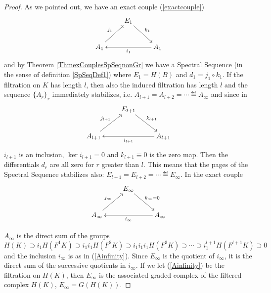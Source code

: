 \documentclass[../main.tex]{subfiles}
\begin{document}
\begin{proof}
    As we pointed out, we have an exact couple (\ref{exactcouple})
    \begin{align*}
     \xymatrix{
&E_1 \ar[rd]^{k_1}& \\
A_1\ar[ur]^{j_1}&& A_1\ar[ll]^{i_1} }
    \end{align*}
    and by Theorem \ref{ThmexCouplesSpSeqnonGr} we have a Spectral Sequence (in the sense of definition \ref{SpSeqDef1}) where $E_1=H(B)$ and $d_1=j_1 \circ k_1$. If the filtration on $K$ has length $l$, then also the induced filtration has length $l$ and the sequence $\{A_r\}_r$ immediately stabilizes, i.e. $A_{l+1}=A_{l+2}= \cdots \eqdef A_\infty$ and since in 
     \begin{align*}
     \xymatrix{
&E_{l+1} \ar[rd]^{k_{l+1}}& \\
A_{l+1}\ar[ur]^{j_{l+1}}&& A_{l+1}\ar[ll]^{i_{l+1}} }
    \end{align*}
    $i_{l+1}$ is an inclusion, $\ker i_{l+1} =0$ and $k_{l+1} \equiv 0$ is the zero map. Then the differentials $d_r$ are all zero for $r$ greater than $l$. This means that the pages of the Spectral Sequence stabilizes also:   $E_{l+1}=E_{l+2}= \cdots \eqdef E_\infty$. In the exact couple 
    \begin{align*}
     \xymatrix{
&E_{\infty} \ar[rd]^{k_{\infty}=0}& \\
A_{\infty}\ar[ur]^{j_{\infty}}&& A_{\infty}\ar[ll]^{i_{\infty}} }
    \end{align*}
    
$A_{\infty}$ is the direct sum of the groups 
\begin{equation} \label{Ainfinity}
    H(K) \supset i_1H(F^1K) \supset i_1i_1H(F^2K) \supset i_1i_1i_1H(F^3K) \supset \cdots \supset i_1^{l+1}H(F^{l+1}K) \supset 0
\end{equation}
and the inclusion $i_\infty$ is as in (\ref{Ainfinity}). Since $E_\infty$ is the quotient of $i_\infty$, it is the direct sum of the successive quotients in $i_\infty$. If we let (\ref{Ainfinity}) be the filtration on $H(K)$, then $E_\infty$ is the associated graded complex of the filtered complex $H(K)$, $E_\infty =G(H(K))$.    
\end{proof}
\end{document}
